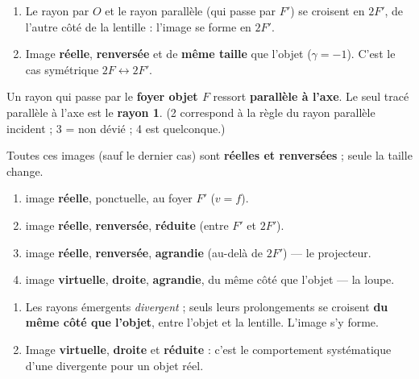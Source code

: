 \documentclass[11pt,a4paper]{article}
\begin{document}

\begin{corrige}
\begin{enumerate}[label=\alph*)]
  \item Le rayon par $O$ et le rayon parallèle (qui passe par $F'$) se croisent en \textbf{$2F'$}, de
        l'autre côté de la lentille : l'image se forme en $2F'$.
  \item Image \textbf{réelle}, \textbf{renversée} et de \textbf{même taille} que l'objet
        ($\gamma=-1$). C'est le cas symétrique $2F\leftrightarrow 2F'$.
\end{enumerate}
\end{corrige}

\begin{corrige}
Un rayon qui passe par le \textbf{foyer objet $F$} ressort \textbf{parallèle à l'axe}. Le seul tracé
parallèle à l'axe est le \textbf{rayon 1}. (2 correspond à la règle du rayon parallèle incident ;
3 = non dévié ; 4 est quelconque.)
\end{corrige}

\begin{corrige}
Toutes ces images (sauf le dernier cas) sont \textbf{réelles et renversées} ; seule la taille change.
\begin{enumerate}[label=\alph*)]
  \item image \textbf{réelle}, ponctuelle, au foyer $F'$ ($v=f$).
  \item image \textbf{réelle}, \textbf{renversée}, \textbf{réduite} (entre $F'$ et $2F'$).
  \item image \textbf{réelle}, \textbf{renversée}, \textbf{agrandie} (au-delà de $2F'$) --- le projecteur.
  \item image \textbf{virtuelle}, \textbf{droite}, \textbf{agrandie}, du même côté que l'objet --- la loupe.
\end{enumerate}
\end{corrige}

\begin{corrige}
\begin{enumerate}[label=\alph*)]
  \item Les rayons émergents \emph{divergent} ; seuls leurs prolongements se croisent \textbf{du même
        côté que l'objet}, entre l'objet et la lentille. L'image s'y forme.
  \item Image \textbf{virtuelle}, \textbf{droite} et \textbf{réduite} : c'est le comportement
        systématique d'une divergente pour un objet réel.
\end{enumerate}
\end{corrige}
\end{document}
